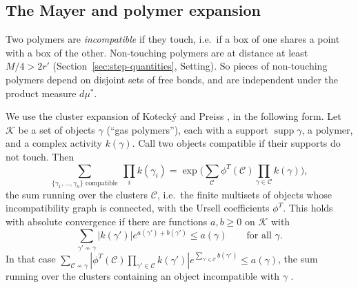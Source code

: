 \subsection{The Mayer and polymer expansion}\label{subsec:cl-mayer}

Two polymers are \emph{incompatible} if they touch, i.e.\ if a box of one shares a point with a box of the other. Non-touching polymers are at distance at least $M/4>2r'$ (Section~\ref{sec:step-quantities}, Setting). So pieces of non-touching polymers depend on disjoint sets of free bonds, and are independent under the product measure $d\mu^*$.

We use the cluster expansion of Koteck\'y and Preiss \cite{KP}, in the following form. Let $\mathcal K$ be a set of objects $\gamma$ (``gas polymers''), each with a support $\operatorname{supp}\gamma$, a polymer, and a complex activity $k(\gamma)$. Call two objects compatible if their supports do not touch. Then
\[
\sum_{\{\gamma_1,\dots,\gamma_n\}\text{ compatible}}\ \prod_ik(\gamma_i)=\exp\Big(\sum_{\mathcal C}\phi^T(\mathcal C)\prod_{\gamma\in\mathcal C}k(\gamma)\Big),
\]
the sum running over the clusters $\mathcal C$, i.e.\ the finite multisets of objects whose incompatibility graph is connected, with the Ursell coefficients $\phi^T$. This holds with absolute convergence if there are functions $a,b\ge0$ on $\mathcal K$ with
\begin{equation}\label{eq:KP}
\sum_{\gamma'\not\sim\gamma}|k(\gamma')|e^{a(\gamma')+b(\gamma')}\le a(\gamma)\qquad\text{for all }\gamma .
\end{equation}
In that case $\sum_{\mathcal C\not\sim\gamma}|\phi^T(\mathcal C)\prod_{\gamma'\in\mathcal C}k(\gamma')|e^{\sum_{\gamma'\in\mathcal C}b(\gamma')}\le a(\gamma)$, the sum running over the clusters containing an object incompatible with $\gamma$ \cite{KP}.

